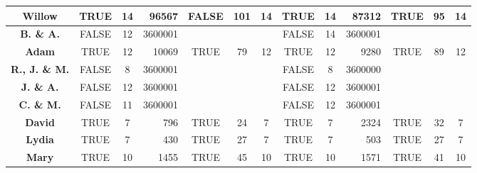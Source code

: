\documentclass{report}
\theoremstyle{plain}
\begin{document}
\begin{figure}
\begin{tabular}{c|c|c|r|c|c|c|c|c|r|c|c|c|}
\multicolumn{1}{|c|}{\textbf{Willow}}                & TRUE            & 14             & 96567         & FALSE          & 101              & 14                  & TRUE            & 14             & 87312         & TRUE           & 95               & 14                  \\ \hline
\multicolumn{1}{|c|}{\textbf{B. \& A.}}           & FALSE           & 12             & 3600001       &                &                  &                     & FALSE           & 14             & 3600001       &                &                  &                     \\ \hline
\multicolumn{1}{|c|}{\textbf{Adam}}                  & TRUE            & 12             & 10069         & TRUE           & 79               & 12                  & TRUE            & 12             & 9280          & TRUE           & 89               & 12                  \\ \hline
\multicolumn{1}{|c|}{\textbf{R., J. \& M.}} & FALSE           & 8              & 3600001       &                &                  &                     & FALSE           & 8              & 3600000       &                &                  &                     \\ \hline
\multicolumn{1}{|c|}{\textbf{J. \& A.}}     & FALSE           & 12             & 3600001       &                &                  &                     & FALSE           & 12             & 3600001       &                &                  &                     \\ \hline
\multicolumn{1}{|c|}{\textbf{C. \& M.}}    & FALSE           & 11             & 3600001       &                &                  &                     & FALSE           & 12             & 3600001       &                &                  &                     \\ \hline
\multicolumn{1}{|c|}{\textbf{David}}                 & TRUE            & 7              & 796           & TRUE           & 24               & 7                   & TRUE            & 7              & 2324          & TRUE           & 32               & 7                   \\ \hline
\multicolumn{1}{|c|}{\textbf{Lydia}}                 & TRUE            & 7              & 430           & TRUE           & 27               & 7                   & TRUE            & 7              & 503           & TRUE           & 27               & 7                   \\ \hline
\multicolumn{1}{|c|}{\textbf{Mary}}                  & TRUE            & 10             & 1455          & TRUE           & 45               & 10                  & TRUE            & 10             & 1571          & TRUE           & 41               & 10                  \\ \hline

\end{tabular}
\end{figure}
\end{document}
